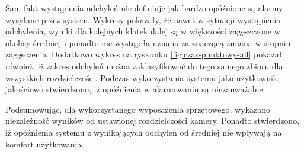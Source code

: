 Sam fakt wystąpienia odchyleń nie definiuje jak bardzo opóźnione są alarmy wysyłane przez system. Wykresy pokazały, że nawet w sytuacji wystąpienia odchylenia, wyniki dla kolejnych klatek dalej są w większości zagęszczone w okolicy średniej i ponadto nie wystąpiła uznana za znaczącą zmiana w stopniu zagęsczenia. Dodatkowo wykres na ryskunku \ref{fig:czas-punktowy-all} pokazał również, iż zakres odchyleń można zaklasyfikować do tego samego zbioru dla wszystkich rozdzielczości.   
Podczas wykorzystania systemu jako użytkownik, jakościowo stwierdzono, iż opóźnienia w alarmowaniu są niezauważalne. 

Podsumowując, dla wykorzystanego wyposażenia sprzętowego, wykazano niezależność wyników od ustawionej rozdzielczości kamery. Ponadto stwierdzono, iż opóźnienia systemu z wynikających odchyleń od średniej nie wpływają na komfort użytkowania.